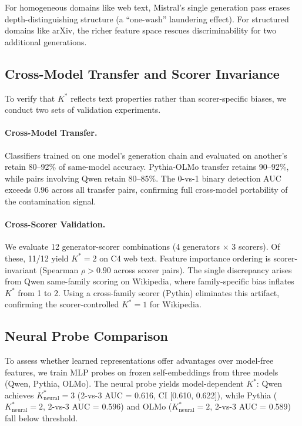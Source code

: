 \documentclass[11pt,a4paper]{article}
\newcommand{\Kstar}{K^{*}}
\begin{document}
For homogeneous domains like web text, Mistral's single generation pass erases depth-distinguishing structure (a ``one-wash'' laundering effect). For structured domains like arXiv, the richer feature space rescues discriminability for two additional generations.

\subsection{Cross-Model Transfer and Scorer Invariance}
\label{sec:scorer}

To verify that $\Kstar$ reflects text properties rather than scorer-specific biases, we conduct two sets of validation experiments.

\paragraph{Cross-Model Transfer.} Classifiers trained on one model's generation chain and evaluated on another's retain 80--92\% of same-model accuracy. Pythia-OLMo transfer retains 90--92\%, while pairs involving Qwen retain 80--85\%. The 0-vs-1 binary detection AUC exceeds 0.96 across all transfer pairs, confirming full cross-model portability of the contamination signal.

\paragraph{Cross-Scorer Validation.} We evaluate 12 generator-scorer combinations (4 generators $\times$ 3 scorers). Of these, 11/12 yield $\Kstar = 2$ on C4 web text. Feature importance ordering is scorer-invariant (Spearman $\rho > 0.90$ across scorer pairs). The single discrepancy arises from Qwen same-family scoring on Wikipedia, where family-specific bias inflates $\Kstar$ from 1 to 2. Using a cross-family scorer (Pythia) eliminates this artifact, confirming the scorer-controlled $\Kstar = 1$ for Wikipedia.

\subsection{Neural Probe Comparison}
\label{sec:neural}

To assess whether learned representations offer advantages over model-free features, we train MLP probes on frozen self-embeddings from three models (Qwen, Pythia, OLMo). The neural probe yields model-dependent $\Kstar$: Qwen achieves $K^*_{\text{neural}} = 3$ (2-vs-3 AUC = 0.616, CI [0.610, 0.622]), while Pythia ($K^*_{\text{neural}} = 2$, 2-vs-3 AUC = 0.596) and OLMo ($K^*_{\text{neural}} = 2$, 2-vs-3 AUC = 0.589) fall below threshold.
\end{document}
